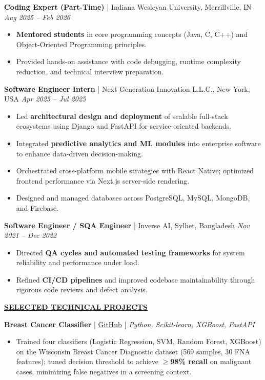 \documentclass[10.5pt,letterpaper]{article}
\newcommand{\sectiontitle}[1]{\vspace{7pt}\noindent\underline{\textbf{#1}}\vspace{5pt}\par}
\newcommand{\jobheader}[3]{\textbf{#1} \; | \; #2 \hfill \textit{#3}\par\vspace{1pt}}
\begin{document}
\jobheader{Coding Expert (Part-Time)}{Indiana Wesleyan University, Merrillville, IN}{Aug 2025 -- Feb 2026}
\begin{itemize}
  \item \textbf{Mentored students} in core programming concepts (Java, C, C++) and Object-Oriented Programming principles.
  \item Provided hands-on assistance with code debugging, runtime complexity reduction, and technical interview preparation.
\end{itemize}

\jobheader{Software Engineer Intern}{Next Generation Innovation L.L.C., New York, USA}{Apr 2025 -- Jul 2025}
\begin{itemize}
  \item Led \textbf{architectural design and deployment} of scalable full-stack ecosystems using Django and FastAPI for service-oriented backends.
  \item Integrated \textbf{predictive analytics and ML modules} into enterprise software to enhance data-driven decision-making.
  \item Orchestrated cross-platform mobile strategies with React Native; optimized frontend performance via Next.js server-side rendering.
  \item Designed and managed databases across PostgreSQL, MySQL, MongoDB, and Firebase.
\end{itemize}

\jobheader{Software Engineer / SQA Engineer}{Inverse AI, Sylhet, Bangladesh}{Nov 2021 -- Dec 2022}
\begin{itemize}
  \item Directed \textbf{QA cycles and automated testing frameworks} for system reliability and performance under load.
  \item Refined \textbf{CI/CD pipelines} and improved codebase maintainability through rigorous code reviews and defect analysis.
\end{itemize}

\sectiontitle{SELECTED TECHNICAL PROJECTS}

\textbf{Breast Cancer Classifier} \; | \; \href{https://github.com/ayanchyaziz123/breast-cancer-classifier}{GitHub} \; | \; \textit{Python, Scikit-learn, XGBoost, FastAPI}
\begin{itemize}
  \item Trained four classifiers (Logistic Regression, SVM, Random Forest, XGBoost) on the Wisconsin Breast Cancer Diagnostic dataset (569 samples, 30 FNA features); tuned decision threshold to achieve \textbf{$\geq$98\% recall} on malignant cases, minimizing false negatives in a screening context.
\end{itemize}
\end{document}
